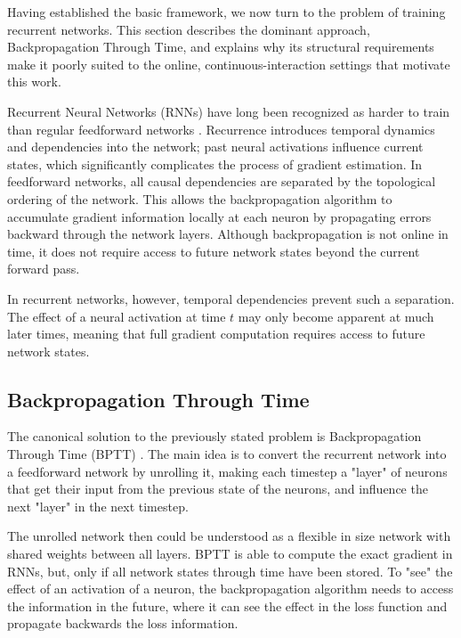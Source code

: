 Having established the basic framework, we now turn to the problem of
training recurrent networks. This section describes the dominant approach,
Backpropagation Through Time, and explains why its structural requirements
make it poorly suited to the online, continuous-interaction settings that
motivate this work.

Recurrent Neural Networks (RNNs) have long been recognized as harder to
train than regular feedforward networks
\citep{learningLongTermHard, Werbos1990BackpropagationTT}. Recurrence
introduces temporal dynamics and dependencies into the network; past neural
activations influence current states, which significantly complicates the
process of gradient estimation. In feedforward networks, all causal
dependencies are separated by the topological ordering of the network.
This allows the backpropagation algorithm to accumulate gradient information
locally at each neuron by propagating errors backward through the network
layers. Although backpropagation is not online in time, it does not require
access to future network states beyond the current forward pass.

In recurrent networks, however, temporal dependencies prevent such a
separation. The effect of a neural activation at time $t$ may only become
apparent at much later times, meaning that full gradient computation requires
access to future network states.

\subsection{Backpropagation Through Time}

The canonical solution to the previously stated problem is Backpropagation Through Time (BPTT) \citep{Werbos1990BackpropagationTT}. The main idea is to convert the recurrent network into a feedforward network by unrolling it, making each timestep a "layer" of neurons that get their input from the previous state of the neurons, and influence the next "layer" in the next timestep. 

The unrolled network then could be understood as a flexible in size network with shared weights between all layers. BPTT is able to compute the exact gradient in RNNs, but, only if all network states through time have been stored. To "see" the effect of an activation of a neuron, the backpropagation algorithm needs to access the information in the future, where it can see the effect in the loss function and propagate backwards the loss information. 

